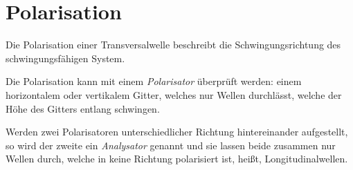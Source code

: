 \documentclass{article}
\begin{document}
\section{Polarisation}
Die Polarisation einer Transversalwelle beschreibt die Schwingungsrichtung des schwingungsfähigen System.
 
Die Polarisation kann mit einem \emph{Polarisator} überprüft werden: einem horizontalem oder vertikalem Gitter, welches nur Wellen durchlässt, welche der Höhe des Gitters entlang schwingen.
 
Werden zwei Polarisatoren unterschiedlicher Richtung hintereinander aufgestellt, so wird der zweite ein \emph{Analysator} genannt und sie lassen beide zusammen nur Wellen durch, welche in keine Richtung polarisiert ist, heißt, Longitudinalwellen.
\end{document}
